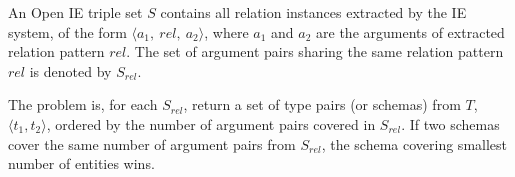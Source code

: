 



An Open IE triple set $S$ contains all relation instances extracted
by the IE system, of the form
$\langle a_1,\ rel,\ a_2 \rangle$, where $a_1$ and $a_2$ are
the arguments of extracted relation pattern $rel$. The set of argument pairs
sharing the same relation pattern $rel$ is denoted by $S_{rel}$.

The problem is, for each $S_{rel}$, return a set of type pairs (or schemas)
from $T$, $\langle t_1, t_2 \rangle$, ordered by the number of argument pairs
covered in $S_{rel}$.  %
If two schemas cover the same number of argument pairs from $S_{rel}$,
the schema covering smallest number of entities wins.




